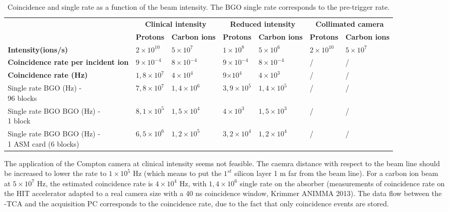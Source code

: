 \begin{table} [!htbp]
  \centering
\begin{tabular}{|p{3.5cm}|p{1.7cm}|p{2cm}|p{1.7cm}|p{2cm}|p{1.5cm}|p{2cm}|}
\hline
		&\multicolumn{2}{c|}{	\bf{Clinical intensity}} &\multicolumn{2}{c|}{ \bf{Reduced intensity}} &\multicolumn{2}{c|}{ \bf{Collimated camera}}\\
		& \bf{Protons}& \bf{Carbon ions} & \bf{Protons}& \bf{Carbon ions} &\bf{Protons}& \bf{Carbon ions} \\
\hline
\bf{Intensity(ions/s)}		& $2\times10^{10}$	&$5\times10^{7}$  & $1\times10^{8}$& $5\times10^{6}$ &$2\times10^{10}$& $5\times10^{7}$ \\
\bf{Coincidence rate per incident ion}		& $9\times10^{-4}$&  $8\times10^{-4}$&  $9\times10^{-4}$& $8\times10^{-4}$& / &  / \\
\bf{Coincidence rate (Hz)}		& $1,8\times10^{7}$&  $4\times10^{4}$&  9$\times10^{4}$& $4\times10^{3}$& / &  / \\
\bf{Single rate BGO (Hz) - \newline 96 blocks}		& 	$7,8\times10^{7}$& $1,4\times10^{6}$ & $3,9\times10^{5}$&$1,4\times10^{5}$ &/&/\\
\bf{Single rate BGO BGO (Hz) - \newline 1 block}		& 	$8,1\times10^{5}$& $1,5\times10^{4}$ & $4\times10^{3}$&$1,5\times10^{3}$ &/&/\\
\bf{Single rate BGO BGO (Hz) - \newline 1 ASM card (6 blocks)}		& 	$6,5\times10^{6}$& $1,2\times10^{5}$ & $3,2\times10^{4}$&$1,2\times10^{4}$ &/&/\\
\hline
\end{tabular}
  \caption{Coincidence and single rate as a function of the beam intensity. The BGO single rate corresponds to the pre-trigger rate.}
\end{table}

\newpage
The application of the Compton camera at clinical intensity seems not feasible. The caemra distance with respect to the beam line should be increased to lower the rate to $1\times10^{5}$ Hz (which means to put the $1^{st}$ silicon layer 1 m far from the beam line).
For a carbon ion beam at $5\times10^{7}$ Hz, the estimated coincidence rate is $4\times10^{4}$ Hz, with $1,4\times10^{6}$ single rate on the absorber (measurements of coincidence rate on the HIT accelerator adapted to a real camera size with a 40 ns coincidence window, Krimmer ANIMMA 2013).
The data flow between the \charmu-TCA and the acquisition PC corresponds to the coincidence rate, due to the fact that only coincidence events are stored.


